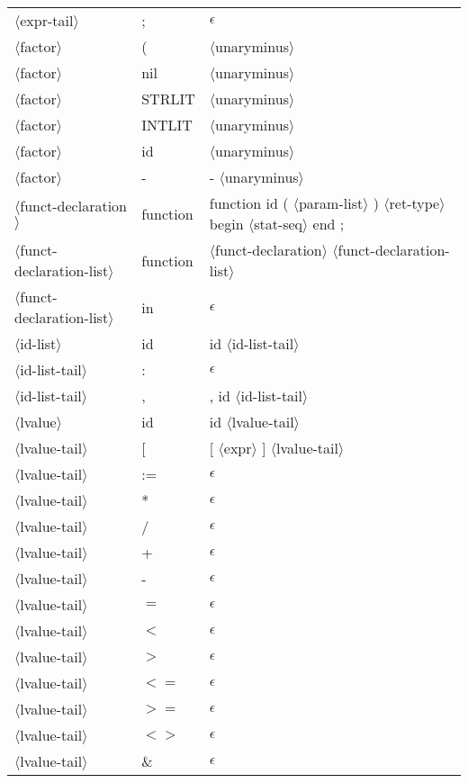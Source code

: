 \documentclass[11pt, fleqn]{article}
\newcommand{\atag}[1]{$\langle$#1$\rangle$}
\begin{document}
\begin{longtable}{l|l|l}
\atag{expr-tail}					&	;		&	$\epsilon$		\\
\atag{factor}					&	(		&	\atag{unaryminus}		\\
\atag{factor}					&	nil		&	\atag{unaryminus}		\\
\atag{factor}					&	STRLIT	&	\atag{unaryminus}		\\
\atag{factor}					&	INTLIT	&	\atag{unaryminus}		\\
\atag{factor}					&	id		&	\atag{unaryminus}		\\
\atag{factor}					&	-		&	- \atag{unaryminus}		\\
\atag{funct-declaration}			&	function		&	function id ( \atag{param-list} ) \atag{ret-type} begin \atag{stat-seq} end ;	\\
\atag{funct-declaration-list}	&	function		&	\atag{funct-declaration} \atag{funct-declaration-list}	\\
\atag{funct-declaration-list}	&	in		&	$\epsilon$	\\
\atag{id-list}					&	id		&	id \atag{id-list-tail}	\\
\atag{id-list-tail}				&	:		&	$\epsilon$	\\
\atag{id-list-tail}				&	,		&	, id \atag{id-list-tail}	\\
\atag{lvalue}					&	id		&	id \atag{lvalue-tail}			\\
\atag{lvalue-tail}				&	[		&	[ \atag{expr} ] \atag{lvalue-tail}		\\
\atag{lvalue-tail}				&	:=		&	$\epsilon$											\\
\atag{lvalue-tail}				&	*		&	$\epsilon$											\\
\atag{lvalue-tail}				&	/		&	$\epsilon$											\\
\atag{lvalue-tail}				&	+		&	$\epsilon$											\\
\atag{lvalue-tail}				&	-		&	$\epsilon$											\\
\atag{lvalue-tail}				&	$=$		&	$\epsilon$											\\
\atag{lvalue-tail}				&	$<$		&	$\epsilon$											\\
\atag{lvalue-tail}				&	$>$		&	$\epsilon$											\\
\atag{lvalue-tail}				&	$<=$		&	$\epsilon$											\\
\atag{lvalue-tail}				&	$>=$		&	$\epsilon$											\\
\atag{lvalue-tail}				&	$<>$		&	$\epsilon$											\\
\atag{lvalue-tail}				&	\&		&	$\epsilon$											\\

\end{longtable}
\end{document}
